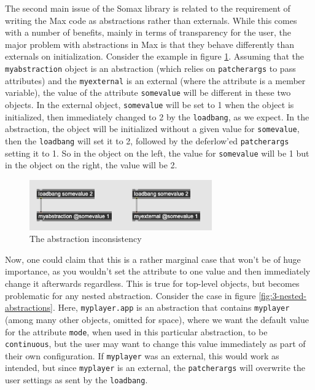 The second main issue of the Somax library is related to the requirement of writing the Max code as abstractions rather than externals. While this comes with a number of benefits, mainly in terms of transparency for the user, the major problem with abstractions in Max is that they behave differently than externals on initialization. Consider the example in figure \ref{fig:3-abstractions-externals}. Assuming that the \texttt{myabstraction} object is an abstraction (which relies on \texttt{patcherargs} to pass attributes) and the \texttt{myexternal} is an external (where the attribute is a member variable), the value of the attribute \texttt{somevalue} will be different in these two objects. In the external object, \texttt{somevalue} will be set to 1 when the object is initialized, then immediately changed to 2 by the \texttt{loadbang}, as we expect. In the abstraction, the object will be initialized without a given value for \texttt{somevalue}, then the \texttt{loadbang} will set it to 2, followed by the deferlow'ed \texttt{patcherargs} setting it to 1. So in the object on the left, the value for \texttt{somevalue} will be 1 but in the object on the right, the value will be 2.

 \begin{figure}[h!]
    \centering        
 	\includegraphics[width=0.7\textwidth, keepaspectratio]{figures/abstractions-externals.png}
    \caption{The abstraction inconsistency}
    \label{fig:3-abstractions-externals}
\end{figure}

\noindent Now, one could claim that this is a rather marginal case that won't be of huge importance, as you wouldn't set the attribute to one value and then immediately change it afterwards regardless. This is true for top-level objects, but becomes problematic for any nested abstraction. Consider the case in figure \ref{fig:3-nested-abstractions}. Here, \texttt{myplayer.app} is an abstraction that contains \texttt{myplayer} (among many other objects, omitted for space), where we want the default value for the attribute \texttt{mode}, when used in this particular abstraction, to be \texttt{continuous}, but the user may want to change this value immediately as part of their own configuration. If \texttt{myplayer} was an external, this would work as intended, but since \texttt{myplayer} is an external, the \texttt{patcherargs} will overwrite the user settings as sent by the \texttt{loadbang}.

